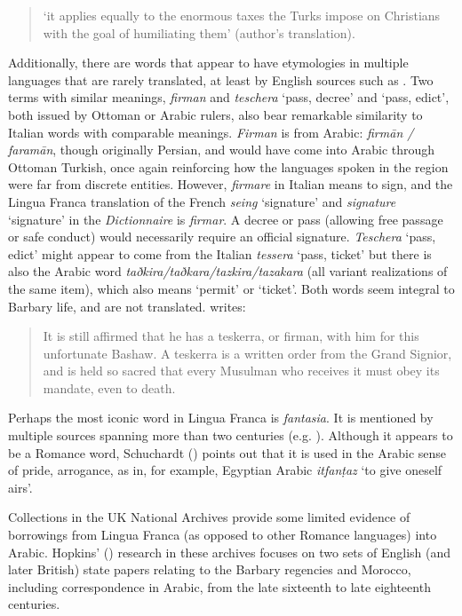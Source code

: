 \documentclass[output=paper]{langsci/langscibook}
\begin{document}
	\begin{quote}
		‘it applies equally to the enormous taxes the Turks impose on Christians with the goal of humiliating them’ (author's translation).
	\end{quote}
	
	Additionally, there are words that appear to have etymologies in multiple languages that are rarely translated, at least by English sources such as \citet{Tully1819}. Two terms with similar meanings, \textit{firman} and \textit{teschera} ‘pass, decree’ and ‘pass, edict’, both issued by Ottoman or Arabic rulers, also bear remarkable similarity to Italian words with comparable meanings. \textit{Firman} is from Arabic: \textit{firmān / faramān}, though originally Persian, and would have come into Arabic through Ottoman Turkish, once again reinforcing how the languages spoken in the region were far from discrete entities. However, \textit{firmare} in Italian means to sign, and the Lingua Franca translation of the French \textit{seing} ‘signature’ and \textit{signature} ‘signature’ in the \textit{Dictionnaire} is \textit{firmar}. A decree or pass (allowing free passage or safe conduct) would necessarily require an official signature. \textit{Teschera} ‘pass, edict’ might appear to come from the Italian \textit{tessera} ‘pass, ticket’ but there is also the Arabic word \textit{taðkira/taðkara/tazkira/tazakara} (all variant realizations of the same item), which also means ‘permit’ or ‘ticket’. Both words seem integral to Barbary life, and are not translated. \citet[258]{Tully1819} writes: 
	
	\begin{quote}
		It is still affirmed that he has a teskerra, or firman, with him for this unfortunate Bashaw. A teskerra is a written order from the Grand Signior, and is held so sacred that every Musulman who receives it must obey its mandate, even to death.
	\end{quote}
	
	Perhaps the most iconic word in Lingua Franca is \textit{fantasia}. It is mentioned by multiple sources spanning more than two centuries (e.g. \citealt{Haedo1612,Broughton1839}). Although it appears to be a Romance word, Schuchardt (\citeyear[71]{Schuchardt1909}) points out that it is used in the Arabic sense of pride, arrogance, as in, for example, Egyptian Arabic \textit{itfanṭaz} ‘to give oneself airs’.
	
	Collections in the UK National Archives provide some limited evidence of borrowings from Lingua Franca (as opposed to other Romance languages) into Arabic. Hopkins' (\citeyear{Hopkins1982}) research in these archives focuses on two sets of English (and later British) state papers relating to the Barbary regencies and Morocco, including correspondence in Arabic, from the late sixteenth to late eighteenth centuries. 
	
\end{document}
